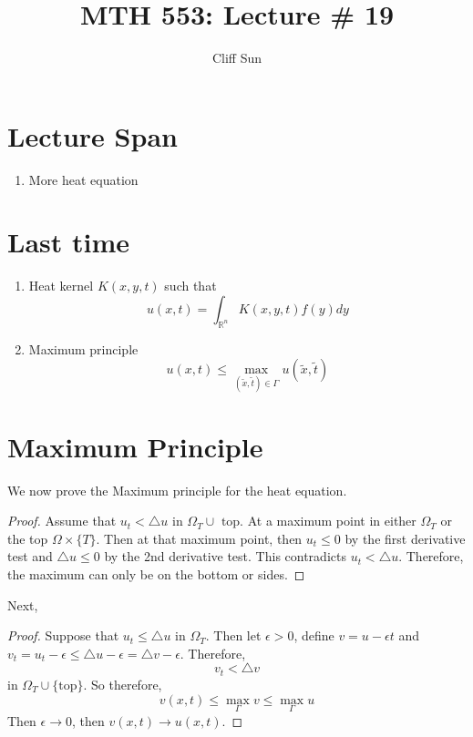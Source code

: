 \documentclass{article}
\title{MTH 553: Lecture \# 19}
\author{Cliff Sun}
\newtheorem{one minute paper}[theorem]{One Minute Paper}
\begin{document}
\maketitle

\section*{Lecture Span}
\begin{enumerate}
    \item More heat equation
\end{enumerate}

\section*{Last time}
\begin{enumerate}
    \item Heat kernel $K(x,y,t)$ such that 
    \begin{equation}
        u(x,t) = \int_{\mathbb{R}^n} K(x,y,t) f(y) dy
    \end{equation}
    \item Maximum principle 
    \begin{equation}
        u(x,t) \leq \max_{(\tilde{x}, \tilde{t}) \in \Gamma} u(\tilde{x}, \tilde{t})
    \end{equation}
\end{enumerate}

\section*{Maximum Principle}

We now prove the Maximum principle for the heat equation.

\begin{proof}
    Assume that $u_t < \triangle u$ in $\Omega_T \cup \text{ top}$. At a maximum point in either $\Omega_T$ or the top $\Omega \times \{T\}$. Then at that maximum point, then $u_t \leq 0$ by the first
    derivative test and $\triangle u \leq 0$ by the 2nd derivative test. This contradicts $u_t < \triangle u$. Therefore, the maximum can only be on the bottom or sides. 
\end{proof}

Next, 

\begin{proof}
    Suppose that $u_t \leq \triangle u$ in $\Omega_T$. Then let $\epsilon > 0$, define $v = u - \epsilon t$ and $v_t = u_t - \epsilon \leq \triangle u - \epsilon = \triangle v  - \epsilon$. Therefore, 
    \begin{equation}
        v_t < \triangle v
    \end{equation}
    in $\Omega_T \cup \{\text{top}\}$. So therefore, 
    \begin{equation}
        v(x,t) \leq \max_{\Gamma}v \leq \max_{\Gamma}u
    \end{equation}
    Then $\epsilon \rightarrow 0$, then $v(x,t) \rightarrow u(x,t)$. 
\end{proof}
\end{document}
